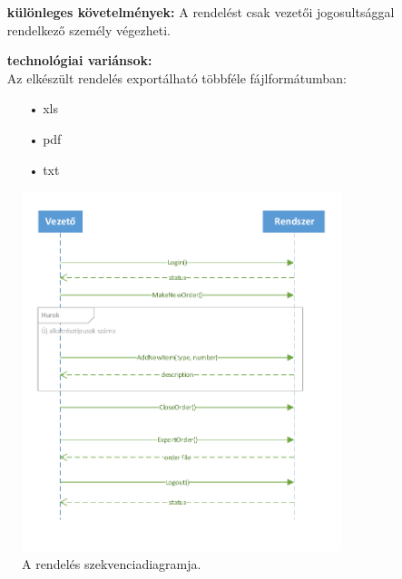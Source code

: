 \documentclass[12pt]{article}\usepackage[left=20mm,right=20mm,top=15mm,bottom=20mm]{geometry}
\begin{document}
\begin{itemize}
\item[] \textbf{különleges követelmények: } A rendelést csak vezetői jogosultsággal rendelkező személy végezheti.

\item[] \textbf{technológiai variánsok: } \\Az elkészült rendelés exportálható többféle fájlformátumban:
\vspace*{-3mm}
\begin{itemize}
\item[•] xls
\item[•] pdf
\item[•] txt
\end{itemize}
\end{itemize} 

\begin{figure}[!h]
    \centering
        \includegraphics[width=0.83\textwidth]{kepek/rendeles_SD.pdf}
        \caption{A rendelés szekvenciadiagramja. \label{fig:rendeles}}
\end{figure}
\end{document}
